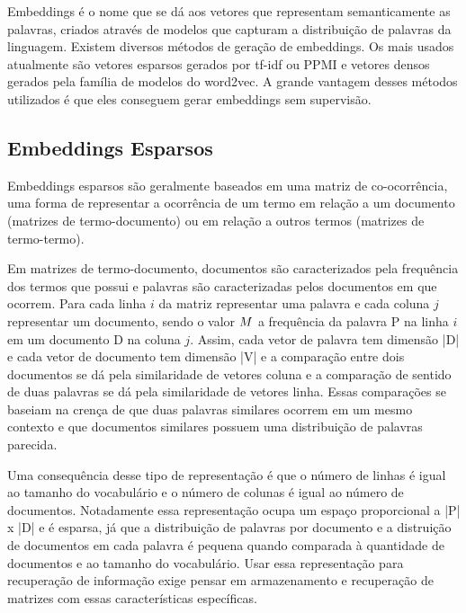 \documentclass[
	12pt,				%
	openright,			%
	oneside,			%
	a4paper,			%
	english,			%
	french,				%
	spanish,			%
	brazil				%
	]{abntex2}
\begin{document}
Embeddings é o nome que se dá aos vetores que representam semanticamente as palavras, criados através de modelos que
capturam a distribuição de palavras da linguagem.
Existem diversos métodos de geração de embeddings.
Os mais usados atualmente são vetores esparsos gerados por tf-idf ou PPMI e vetores densos gerados pela
família de modelos do word2vec.
A grande vantagem desses métodos utilizados é que eles conseguem gerar embeddings sem supervisão.
\cite{JurafskyMartin2023}

\subsection{Embeddings Esparsos}\label{subsec:embeddings-esparsos}

Embeddings esparsos são geralmente baseados em uma matriz de co-ocorrência, uma forma de representar a ocorrência de um
termo em relação a um documento (matrizes de termo-documento) ou em relação a outros termos (matrizes de termo-termo).
\cite{JurafskyMartin2023}

Em matrizes de termo-documento, documentos são caracterizados pela frequência dos termos que possui e palavras são caracterizadas
pelos documentos em que ocorrem.
Para cada linha $i$ da matriz representar uma palavra e cada coluna $j$ representar
um documento, sendo o valor $M\index{i,j}$ a frequência da palavra P na linha $i$ em um documento D na coluna $j$.
Assim, cada vetor de palavra tem dimensão |D| e cada vetor de documento tem dimensão |V| e a comparação entre dois documentos
se dá pela similaridade de vetores coluna e a comparação de sentido de duas palavras se dá pela similaridade de vetores linha.
Essas comparações se baseiam na crença de que duas palavras similares ocorrem em um mesmo contexto e que documentos similares
possuem uma distribuição de palavras parecida.

Uma consequência desse tipo de representação é que o número de linhas é igual ao tamanho do vocabulário e o número de colunas
é igual ao número de documentos.
Notadamente essa representação ocupa um espaço proporcional a |P| x |D| e é esparsa, já que a distribuição de palavras por documento e
a distruição de documentos em cada palavra é pequena quando comparada à quantidade de documentos e ao tamanho do vocabulário.
Usar essa representação para recuperação de informação exige pensar em armazenamento e recuperação de matrizes com essas
características específicas.
\cite{JurafskyMartin2023}
\end{document}
